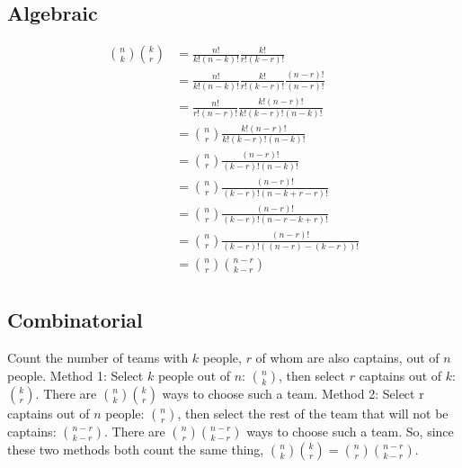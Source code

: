 \documentclass{article}
\begin{document}
\section{} %
\subsection*{Algebraic}
	\begin{align*}
		{n\choose{k}}{k\choose{r}}&=\frac{n!}{k!(n-k)!}\frac{k!}{r!(k-r)!}\\
		&=\frac{n!}{k!(n-k)!}\frac{k!}{r!(k-r)!}\frac{(n-r)!}{(n-r)!}\\
		&=\frac{n!}{r!(n-r)!}\frac{k!(n-r)!}{k!(k-r)!(n-k)!}\\
		&={n\choose{r}}\frac{k!(n-r)!}{k!(k-r)!(n-k)!}\\
		&={n\choose{r}}\frac{(n-r)!}{(k-r)!(n-k)!}\\
		&={n\choose{r}}\frac{(n-r)!}{(k-r)!(n-k+r-r)!}\\
		&={n\choose{r}}\frac{(n-r)!}{(k-r)!(n-r-k+r)!}\\
		&={n\choose{r}}\frac{(n-r)!}{(k-r)!((n-r)-(k-r))!}\\
		&={n\choose{r}}{{n-r}\choose{k-r}}\\
	\end{align*}
\subsection*{Combinatorial}
	Count the number of teams with $k$ people, $r$ of whom are also captains, out of $n$ people.
	\newline
	\newline
	Method 1: Select $k$ people out of $n$: $n\choose{k}$, then select $r$ captains out of $k$:
	$k\choose{r}$. There are ${n\choose{k}}{k\choose{r}}$ ways to choose such a team.
	\newline
	\newline
	Method 2: Select r captains out of $n$ people: $n\choose{r}$, then select the rest of the
	team that will not be captains: ${{n-r}\choose{k-r}}$. There are ${n\choose{r}}{{n-r}\choose{k-r}}$
	ways to choose such a team.
	\newline
	\newline
	So, since these two methods both count the same thing,
	${n\choose{k}}{k\choose{r}}={n\choose{r}}{{n-r}\choose{k-r}}$.
\section{} %
\end{document}
